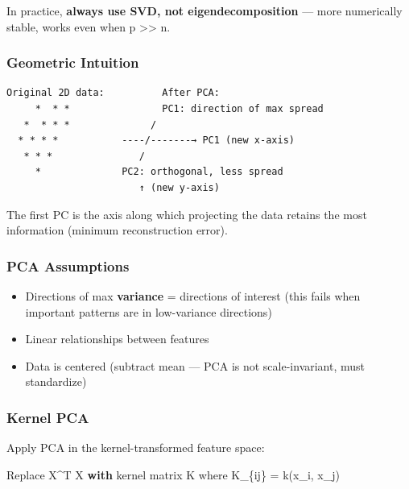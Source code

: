\documentclass[11pt]{article}
\providecommand{\tightlist}{\setlength{\itemsep}{1pt}\setlength{\parskip}{0pt}}
\newenvironment{Shaded}{\begin{snugshade}}{\end{snugshade}}
\newcommand{\ControlFlowTok}[1]{\textcolor[rgb]{0.99,0.74,0.29}{\textbf{#1}}}
\newcommand{\NormalTok}[1]{\textcolor[rgb]{0.81,0.81,0.76}{#1}}
\newcommand{\OperatorTok}[1]{\textcolor[rgb]{0.81,0.81,0.76}{#1}}
\begin{document}
In practice, \textbf{always use SVD, not eigendecomposition} --- more numerically stable, works even when p \textgreater\textgreater{} n.

\subsubsection{Geometric Intuition}\label{geometric-intuition}

\setcodelang{}

\begin{verbatim}
Original 2D data:          After PCA:
     *  * *                PC1: direction of max spread
   *  * * *              /
  * * * *           ----/-------→ PC1 (new x-axis)
   * * *               /
     *              PC2: orthogonal, less spread
                       ↑ (new y-axis)
\end{verbatim}

The first PC is the axis along which projecting the data retains the most information (minimum reconstruction error).

\subsubsection{PCA Assumptions}\label{pca-assumptions}

\begin{itemize}
\tightlist
\item
  Directions of max \textbf{variance} = directions of interest (this fails when important patterns are in low-variance directions)
\item
  Linear relationships between features
\item
  Data is centered (subtract mean --- PCA is not scale-invariant, must standardize)
\end{itemize}

\subsubsection{Kernel PCA}\label{kernel-pca}

Apply PCA in the kernel-transformed feature space:


\begin{Shaded}
\begin{Highlighting}[]
\NormalTok{Replace X}\OperatorTok{\^{}}\NormalTok{T X }\ControlFlowTok{with}\NormalTok{ kernel matrix K where K\_\{ij\} }\OperatorTok{=}\NormalTok{ k(x\_i, x\_j)}
\end{Highlighting}
\end{Shaded}
\end{document}
